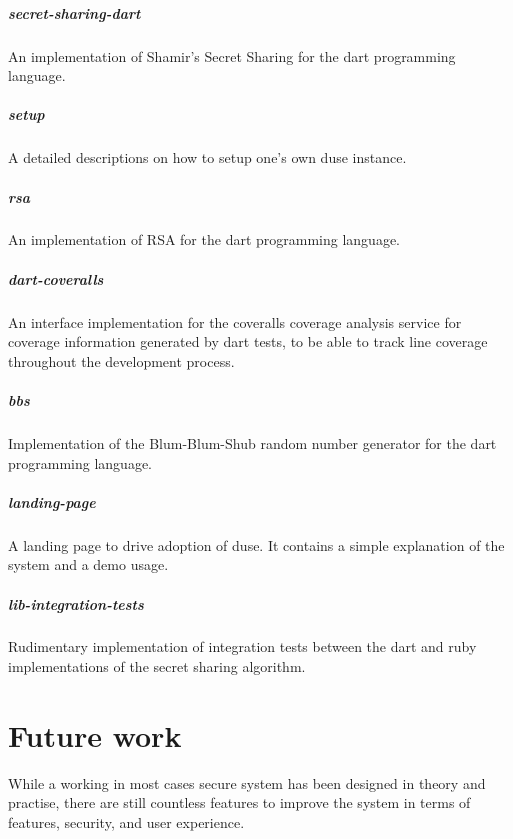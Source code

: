 \paragraph{secret-sharing-dart} An implementation of Shamir's Secret Sharing
for the dart programming language.

\paragraph{setup} A detailed descriptions on how to setup one's own duse
instance.

\paragraph{rsa} An implementation of RSA for the dart programming language.

\paragraph{dart-coveralls} An interface implementation for the coveralls
coverage analysis service for coverage information generated by dart tests,
to be able to track line coverage throughout the development process.

\paragraph{bbs} Implementation of the Blum-Blum-Shub random number generator
for the dart programming language.

\paragraph{landing-page} A landing page to drive adoption of duse. It contains
a simple explanation of the system and a demo usage.

\paragraph{lib-integration-tests} Rudimentary implementation of integration
tests between the dart and ruby implementations of the secret sharing algorithm.

\chapter{Future work}

While a working in most cases secure system has been designed in theory and
practise, there are still countless features to improve the system in terms of
features, security, and user experience.

